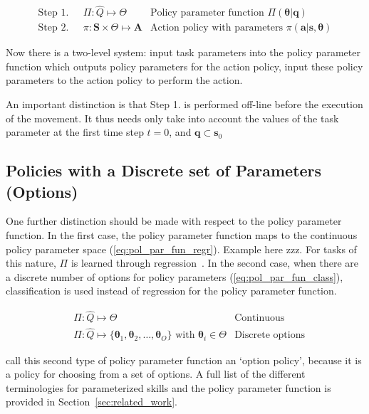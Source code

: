 \documentclass[12pt]{article}
\newcommand{\mymath}[1]{\ensuremath{#1}\xspace}
\newcommand{\pol}    {\mymath{\pi}}
\newcommand{\act}    {\mymath{\mathbf{a}}}
\newcommand{\actsp}  {\mymath{\mathbf{A}}}
\newcommand{\sta}    {\mymath{\mathbf{s}}}
\newcommand{\stasp}  {\mymath{\mathbf{S}}}
\newcommand{\app}    {\mymath{\bm{\theta}}}
\newcommand{\appsp}  {\mymath{\Theta}}
\newcommand{\polg}   {\mymath{\Pi}}
\newcommand{\taskp}  {\mymath{\mathbf{q}}}
\newcommand{\taskpsp}{\mymath{Q}}
\begin{document}
\begin{align}
\mbox{Step 1.~~}&\polg:\hat{\taskpsp}\mapsto\appsp & \mbox{Policy parameter function~} \polg(\app|\taskp)\label{eq:pol_par_fun}\\
\mbox{Step 2.~~}&\pol:\stasp\times\appsp\mapsto\actsp & \mbox{Action policy with parameters~}  \pol(\act|\sta,\app)
\end{align}

Now there is a two-level system: input task parameters into the policy parameter function which outputs policy parameters for the action policy, input these policy parameters to the action policy to perform the action. 

An important distinction is that Step 1. is performed off-line before the execution of the movement. It thus needs only take into account the values of the task parameter at the first time step $t=0$, and $\taskp \subset \sta_0$


\subsection{Policies with a Discrete set of Parameters (Options)}

One further distinction should be made with respect to the policy parameter function. In the first case, the policy parameter function maps to the continuous policy parameter space (\ref{eq:pol_par_fun_regr}). Example here zzz. For tasks of this nature, \polg is learned through regression~\cite{ude10taskspecific,matsubara11learning,silva12learning,stulp13learning}.
In the second case, when there are a discrete number of options for policy parameters (\ref{eq:pol_par_fun_class}), classification is used instead of regression for the policy parameter function.

\begin{align}
&\polg : \hat{\taskpsp} \mapsto \appsp & \mbox{Continuous} \label{eq:pol_par_fun_regr}\\
&\polg : \hat{\taskpsp} \mapsto \{\app_1,\app_2,\dots,\app_O\} \mbox{~with~} \app_i \in \appsp & \mbox{Discrete options} \label{eq:pol_par_fun_class}
\end{align}

\citet{daniel12learning} call this second type of policy parameter function an `option policy', because it is a policy for choosing from a set of options. A full list of the different terminologies for parameterized skills and the policy parameter function is provided in Section~\ref{sec:related_work}. 
\end{document}
